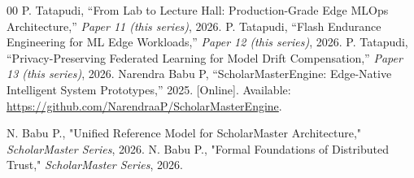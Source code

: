 \documentclass[conference]{IEEEtran}
\begin{document}
\begin{thebibliography}{00}
 P. Tatapudi, ``From Lab to Lecture Hall: Production-Grade Edge MLOps Architecture,'' \textit{Paper 11 (this series)}, 2026.
 P. Tatapudi, ``Flash Endurance Engineering for ML Edge Workloads,'' \textit{Paper 12 (this series)}, 2026.
 P. Tatapudi, ``Privacy-Preserving Federated Learning for Model Drift Compensation,'' \textit{Paper 13 (this series)}, 2026.
 Narendra Babu P, ``ScholarMasterEngine: Edge-Native Intelligent System Prototypes,'' 2025. [Online]. Available: \url{https://github.com/NarendraaP/ScholarMasterEngine}.


 N. Babu P., "Unified Reference Model for ScholarMaster Architecture," \textit{ScholarMaster Series}, 2026.
 N. Babu P., "Formal Foundations of Distributed Trust," \textit{ScholarMaster Series}, 2026.
\end{thebibliography}
\end{document}

